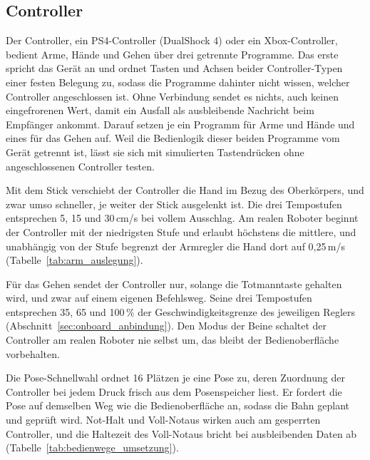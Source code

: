 \subsection{Controller}
\label{sec:controller}
Der Controller, ein PS4-Controller (DualShock 4) oder ein Xbox-Controller, bedient Arme, Hände und Gehen über drei getrennte Programme.
Das erste spricht das Gerät an und ordnet Tasten und Achsen beider Controller-Typen einer festen Belegung zu, sodass die Programme dahinter nicht wissen, welcher Controller angeschlossen ist.
Ohne Verbindung sendet es nichts, auch keinen eingefrorenen Wert, damit ein Ausfall als ausbleibende Nachricht beim Empfänger ankommt.
Darauf setzen je ein Programm für Arme und Hände und eines für das Gehen auf.
Weil die Bedienlogik dieser beiden Programme vom Gerät getrennt ist, lässt sie sich mit simulierten Tastendrücken ohne angeschlossenen Controller testen.

Mit dem Stick verschiebt der Controller die Hand im Bezug des Oberkörpers, und zwar umso schneller, je weiter der Stick ausgelenkt ist.
Die drei Tempostufen entsprechen 5, 15 und 30\,cm/s bei vollem Ausschlag.
Am realen Roboter beginnt der Controller mit der niedrigsten Stufe und erlaubt höchstens die mittlere, und unabhängig von der Stufe begrenzt der Armregler die Hand dort auf 0,25\,m/s (Tabelle~\ref{tab:arm_auslegung}).

Für das Gehen sendet der Controller nur, solange die Totmanntaste gehalten wird, und zwar auf einem eigenen Befehlsweg.
Seine drei Tempostufen entsprechen 35, 65 und 100\,\% der Geschwindigkeitsgrenze des jeweiligen Reglers (Abschnitt~\ref{sec:onboard_anbindung}).
Den Modus der Beine schaltet der Controller am realen Roboter nie selbst um, das bleibt der Bedienoberfläche vorbehalten.

Die Pose-Schnellwahl ordnet 16 Plätzen je eine Pose zu, deren Zuordnung der Controller bei jedem Druck frisch aus dem Posenspeicher liest.
Er fordert die Pose auf demselben Weg wie die Bedienoberfläche an, sodass die Bahn geplant und geprüft wird.
Not-Halt und Voll-Notaus wirken auch am gesperrten Controller, und die Haltezeit des Voll-Notaus bricht bei ausbleibenden Daten ab (Tabelle~\ref{tab:bedienwege_umsetzung}).

